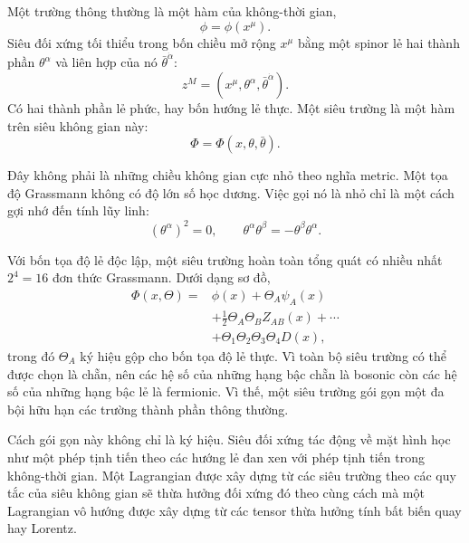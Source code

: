 Một trường thông thường là một hàm của không-thời gian,
\begin{equation}
\phi=\phi(x^\mu).
\end{equation}
Siêu đối xứng tối thiểu trong bốn chiều mở rộng \(x^\mu\) bằng một spinor lẻ hai thành phần \(\theta^\alpha\) và liên hợp của nó \(\bar\theta^{\dot\alpha}\):
\begin{equation}
z^M=(x^\mu,\theta^\alpha,\bar\theta^{\dot\alpha}).
\end{equation}
Có hai thành phần lẻ phức, hay bốn hướng lẻ thực. Một siêu trường là một hàm trên siêu không gian này:
\begin{equation}
\Phi=\Phi(x,\theta,\bar\theta).
\end{equation}

Đây không phải là những chiều không gian cực nhỏ theo nghĩa metric. Một tọa độ Grassmann không có độ lớn số học dương. Việc gọi nó là nhỏ chỉ là một cách gợi nhớ đến tính lũy linh:
\begin{equation}
(\theta^\alpha)^2=0,
\qquad
\theta^\alpha\theta^\beta=-\theta^\beta\theta^\alpha.
\end{equation}

Với bốn tọa độ lẻ độc lập, một siêu trường hoàn toàn tổng quát có nhiều nhất \(2^4=16\) đơn thức Grassmann. Dưới dạng sơ đồ,
\begin{equation}
\begin{aligned}
\Phi(x,\Theta)={}&\phi(x)+\Theta_A\psi_A(x)\\
&+\frac{1}{2}\Theta_A\Theta_B Z_{AB}(x)+\cdots\\
&+\Theta_1\Theta_2\Theta_3\Theta_4D(x),
\end{aligned}
\end{equation}
trong đó \(\Theta_A\) ký hiệu gộp cho bốn tọa độ lẻ thực. Vì toàn bộ siêu trường có thể được chọn là chẵn, nên các hệ số của những hạng bậc chẵn là bosonic còn các hệ số của những hạng bậc lẻ là fermionic. Vì thế, một siêu trường gói gọn một đa bội hữu hạn các trường thành phần thông thường.

Cách gói gọn này không chỉ là ký hiệu. Siêu đối xứng tác động về mặt hình học như một phép tịnh tiến theo các hướng lẻ đan xen với phép tịnh tiến trong không-thời gian. Một Lagrangian được xây dựng từ các siêu trường theo các quy tắc của siêu không gian sẽ thừa hưởng đối xứng đó theo cùng cách mà một Lagrangian vô hướng được xây dựng từ các tensor thừa hưởng tính bất biến quay hay Lorentz.

